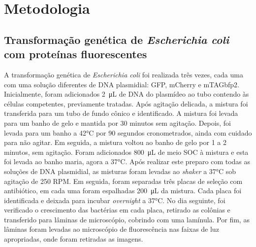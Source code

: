 \section{Metodologia}
\subsection{Transformação genética de \textit{Escherichia coli} com proteínas
fluorescentes}
A transformação genética de \textit{Escherichia coli} foi realizada três vezes,
cada uma com uma solução diferentes de DNA plasmidial: GFP, mCherry e
mTAGbfp2. Inicialmente, foram adicionados \qty{2}{\micro\liter} de DNA do
plasmídeo ao tubo contendo às células competentes, previamente tratadas. Após
agitação delicada, a mistura foi transferida para um tubo de fundo cônico e
identificado. A mistura foi levada para um banho de gelo e mantida por 30
minutos sem agitação. Depois, foi levada para um banho a 42°C por 90 segundos
cronometrados, ainda com cuidado para não agitar. Em seguida, a mistura voltou
ao banho de gelo por 1 a 2 minutos, sem agitação. Foram adicionados
\qty{800}{\micro\liter} de meio SOC à mistura e esta foi levada ao banho maria,
agora a 37°C. Após realizar este preparo com todas as soluções de DNA
plasmidial, as misturas foram levadas ao \textit{shaker} a 37°C sob agitação de
250 RPM. Em seguida, foram separadas três placas de seleção com antibiótico, em
cada uma foram espalhadas \qty{200}{\micro\liter} da mistura. Cada placa foi
identificada e deixada para incubar \textit{overnight} a 37°C. No dia seguinte, foi
verificado o crescimento das bactérias em cada placa, retirado as colônias e
transferido para lâminas de microscópio, cobrindo com uma lamínula. Por fim, as
lâminas foram levadas ao microscópio de fluorescência nas faixas de luz
apropriadas, onde foram retiradas as imagens.


